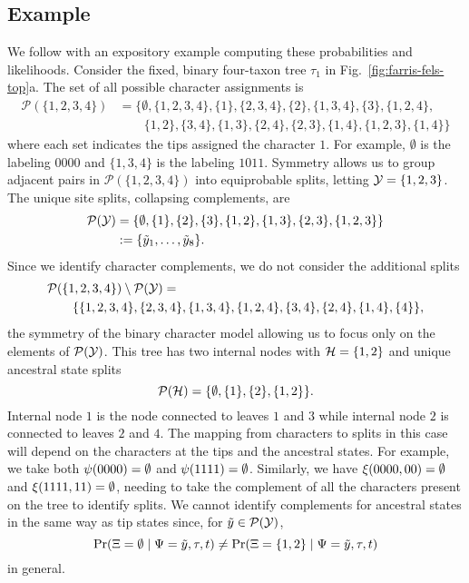 \subsection*{Example}
We follow with an expository example computing these probabilities and likelihoods.
Consider the fixed, binary four-taxon tree $\tau_1$ in Fig.~\ref{fig:farris-fels-top}a.
The set of all possible character assignments is
\begin{align*}
\mathcal{P}(\{1,2,3,4\}) &= \{\emptyset, \{1,2,3,4\}, \{1\}, \{2,3,4\}, \{2\}, \{1,3,4\}, \{3\}, \{1,2,4\}, \\
                         &\qquad \{1,2\}, \{3,4\}, \{1,3\}, \{2,4\}, \{2,3\}, \{1,4\}, \{1,2,3\}, \{1,4\}\}
\end{align*}
where each set indicates the tips assigned the character $1$.
For example, $\emptyset$ is the labeling $0000$ and $\{1,3,4\}$ is the labeling $1011$.
Symmetry allows us to group adjacent pairs in $\mathcal{P}(\{1,2,3,4\})$ into equiprobable splits, letting $\mathcal{Y}=\{1,2,3\}$.
The unique site splits, collapsing complements, are
\begin{align*}
    \mathcal{P}(\mathcal{Y}) &= \{\emptyset, \{1\}, \{2\}, \{3\}, \{1,2\}, \{1,3\}, \{2,3\}, \{1,2,3\}\} \\
& := \{\tilde{y}_1, \ldots, \tilde{y}_8\}.
\end{align*}
Since we identify character complements, we do not consider the additional splits
\begin{equation*}
\begin{split}
& \mathcal{P}(\{1,2,3,4\}) \setminus \mathcal{P}(\mathcal{Y}) = \\
&\qquad \{\{1,2,3,4\}, \{2,3,4\}, \{1,3,4\}, \{1,2,4\}, \{3,4\}, \{2,4\}, \{1,4\}, \{4\}\},
\end{split}
\end{equation*}
the symmetry of the binary character model allowing us to focus only on the elements of $\mathcal{P}(\mathcal{Y})$.
This tree has two internal nodes with $\mathcal{H}=\{1,2\}$ and unique ancestral state splits
\[
\mathcal{P}(\mathcal{H}) = \{\emptyset, \{1\}, \{2\}, \{1,2\}\}.
\]
Internal node $1$ is the node connected to leaves $1$ and $3$ while internal node $2$ is connected to leaves $2$ and $4$.
The mapping from characters to splits in this case will depend on the characters at the tips and the ancestral states.
For example, we take both $\psi(0000)=\emptyset$ and $\psi(1111)=\emptyset$.
Similarly, we have $\xi(0000, 00) = \emptyset$ and $\xi(1111, 11)=\emptyset$, needing to take the complement of all the characters present on the tree to identify splits.
We cannot identify complements for ancestral states in the same way as tip states since, for $\tilde{y}\in\mathcal{P}(\mathcal{Y})$,
\[
\Pr(\Xi=\emptyset \mid \Psi=\tilde{y}, \tau, t)\neq \Pr(\Xi=\{1,2\} \mid \Psi=\tilde{y}, \tau, t)
\]
in general.

